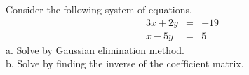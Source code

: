 \documentclass{ximera}
\author{Parisa Fatheddin}
\begin{document}
\begin{exercise}
Consider the following system of equations. 
\begin{eqnarray*}
3x+ 2y&=& -19\\
x-5y &=& 5
\end{eqnarray*}
a. Solve by Gaussian elimination method. \\
b. Solve by finding the inverse of the coefficient matrix. 
\end{exercise} 
\end{document}
